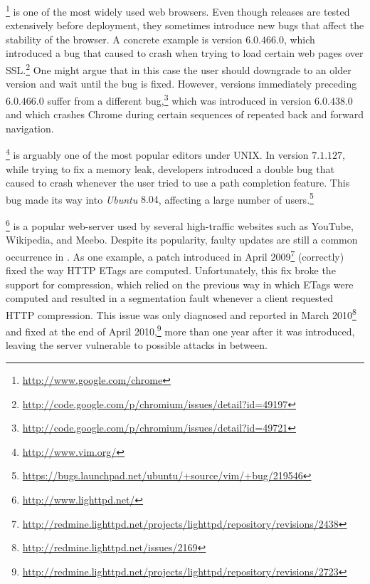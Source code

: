 
\gchrome\footnote{\url{http://www.google.com/chrome}} is one of the most widely 
used web browsers.  Even though \chrome releases are tested
extensively before deployment, they sometimes introduce new bugs that
affect the stability of the browser.  A concrete example is version
$6.0.466.0$, which introduced a bug that caused \chrome to crash when
trying to load certain web pages over
SSL.\footnote{\url{http://code.google.com/p/chromium/issues/detail?id=49197}}
One might argue that in this case the user should downgrade to an
older version and wait until the bug is fixed. However, versions
immediately preceding $6.0.466.0$ suffer from a different
bug,\footnote{\url{http://code.google.com/p/chromium/issues/detail?id=49721}}
which was introduced in version $6.0.438.0$ and which crashes Chrome
during certain sequences of repeated back and forward navigation.

\vim\footnote{\url{http://www.vim.org/}} is arguably one of the most popular 
editors under UNIX.  In version $7.1.127$, while trying to fix a
memory leak, \vim developers introduced a double  bug
that caused \vim to crash whenever the user tried to use a path
completion feature.  This bug made its way into \textit{Ubuntu}
$8.04$, affecting a large number of
users.\footnote{\url{https://bugs.launchpad.net/ubuntu/+source/vim/+bug/219546}}

\lighttpd\footnote{\url{http://www.lighttpd.net/}} is a popular 
web-server used by several high-traffic websites such as YouTube,
Wikipedia, and Meebo. Despite its popularity, faulty updates are still
a common occurrence in \lighttpd.
As one example, a patch introduced in April
2009\footnote{\url{http://redmine.lighttpd.net/projects/lighttpd/repository/revisions/2438}}
(correctly) fixed the way HTTP ETags are computed.
Unfortunately, this fix broke the support for compression, which
relied on the previous way in which ETags were computed and resulted in
a segmentation fault whenever a client requested HTTP compression.
This issue was only 
diagnosed and reported in March
2010\footnote{\url{http://redmine.lighttpd.net/issues/2169}} and
fixed at the end of April 2010,\footnote{\url{http://redmine.lighttpd.net/projects/lighttpd/repository/revisions/2723}} more than one
year after it was introduced, leaving the server vulnerable to
possible attacks in between.

